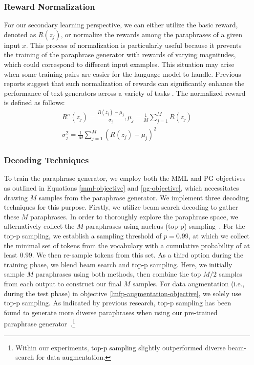 \documentclass[11pt]{article}
\begin{document}
\subsubsection{Reward Normalization}
For our secondary learning perspective, we can either utilize the basic reward, denoted as $R(z_{j})$, or normalize the rewards among the paraphrases of a given input $x$. This process of normalization is particularly useful because it prevents the training of the paraphrase generator with rewards of varying magnitudes, which could correspond to different input examples. This situation may arise when some training pairs are easier for the language model to handle. Previous reports suggest that such normalization of rewards can significantly enhance the performance of text generators across a variety of tasks \cite{guo-etal-2022-efficient}. The normalized reward is defined as follows:
\begin{multline}
R^{n}(z_{j}) = \frac{R(z_{j}) - \mu_{j}}{\sigma_{j}}, \mu_{j} = \frac{1}{M} \sum^{M}_{j=1} R(z_{j}) \\
\sigma^{2}_{j} = \frac{1}{M} \sum^{M}_{j=1} (R(z_{j}) - \mu_{j})^2
\label{normal-reward}
\end{multline}

\subsubsection{Decoding Techniques}
To train the paraphrase generator, we employ both the MML and PG objectives as outlined in Equations \ref{mml-objective} and \ref{pg-objective}, which necessitates drawing $M$ samples from the paraphrase generator. We implement three decoding techniques for this purpose. Firstly, we utilize beam search decoding to gather these $M$ paraphrases. In order to thoroughly explore the paraphrase space, we alternatively collect the $M$ paraphrases using nucleus (top-p) sampling~\cite{holtzman2020curious}. For the top-p sampling, we establish a sampling threshold of $p=0.99$, at which we collect the minimal set of tokens from the vocabulary with a cumulative probability of at least $0.99$. We then re-sample tokens from this set. As a third option during the training phase, we blend beam search and top-p sampling. Here, we initially sample $M$ paraphrases using both methods, then combine the top $M/2$ samples from each output to construct our final $M$ samples. For data augmentation (i.e., during the test phase) in objective \ref{lmfp-augmentation-objective}, we solely use top-p sampling. As indicated by previous research, top-p sampling has been found to generate more diverse paraphrases when using our pre-trained paraphrase generator~\cite{xu-etal-2020-autoqa}.\footnote{Within our experiments, top-p sampling slightly outperformed diverse beam-search for data augmentation.}
\end{document}
